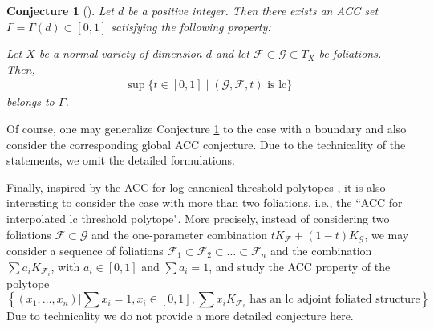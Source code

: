 \documentclass[12pt]{amsart}
\numberwithin{equation}{section}
\newcommand{\Ff}{\mathcal{F}}
\newcommand{\Gg}{\mathcal{G}}
\newcommand{\Ii}{\Gamma}
\newtheorem{conj}[thm]{Conjecture}
\theoremstyle{definition}
\theoremstyle{definition}
\theoremstyle{definition}
\begin{document}
\begin{conj}[{\cite[50:55]{McK23}}]\label{conj: two foliation interpolated acc}
    Let $d$ be a positive integer. Then there exists an ACC set 
    $\Ii=\Ii(d) \subset [0, 1]$
    satisfying the following property:

    Let $X$ be a normal variety of dimension $d$ and let $\Ff\subset\Gg\subset T_X$ be foliations.
    Then,
    \begin{align*}
\sup\{t\in [0,1]\mid (\Gg,\Ff,t)\text{ is lc}\}
    \end{align*}
    belongs to $\Ii$.
\end{conj}

Of course, one may generalize Conjecture \ref{conj: two foliation interpolated acc} to the case with a boundary and also consider the corresponding global ACC conjecture. Due to the technicality of the statements, we omit the detailed formulations.

Finally, inspired by the ACC for log canonical threshold polytopes \cite[Theorem 1.1]{HLQ21}, it is also interesting to consider the case with more than two foliations, i.e., the ``ACC for interpolated lc threshold polytope". More precisely, instead of considering two foliations $\Ff \subset \Gg$ and the one-parameter combination $tK_{\Ff}+(1-t)K_{\Gg}$, we may consider a sequence of foliations $\Ff_1 \subset \Ff_2 \subset \dots \subset \Ff_n$ and the combination $\sum a_iK_{\Ff_i}$, with $a_i \in [0,1]$ and $\sum a_i = 1$, and study the ACC property of the polytope
$$\left\{(x_1,\dots,x_n)\Big| \sum x_i=1, x_i\in [0,1], \sum x_iK_{\Ff_i}\text{ has an lc adjoint foliated structure}\right\}.$$
Due to technicality we do not provide a more detailed conjecture here.
\end{document}
